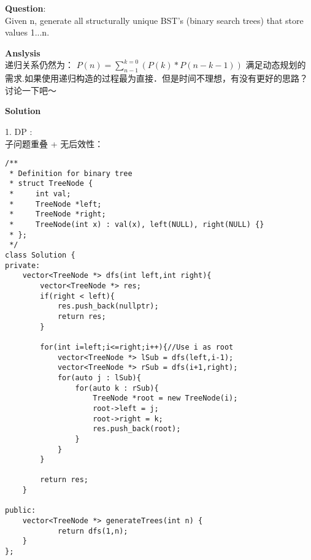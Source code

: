 \begin{description}
    \item{\textbf{Question}}:\\%
		Given n, generate all structurally unique BST's (binary search trees) that store values 1...n.\\

    \item{\textbf{Anslysis}}\\
		递归关系仍然为：
		$P(n)=\sum_{n-1}^{k=0}(P(k)\ast P(n-k-1))$
		满足动态规划的需求.如果使用递归构造的过程最为直接．但是时间不理想，有没有更好的思路？讨论一下吧～
		

    \item{\textbf{Solution}}\\
	\item{1. DP} : \\
		子问题重叠 + 无后效性：\\

    \begin{lstlisting}
/**
 * Definition for binary tree
 * struct TreeNode {
 *     int val;
 *     TreeNode *left;
 *     TreeNode *right;
 *     TreeNode(int x) : val(x), left(NULL), right(NULL) {}
 * };
 */
class Solution {
private:
    vector<TreeNode *> dfs(int left,int right){
        vector<TreeNode *> res;
        if(right < left){
            res.push_back(nullptr);
            return res;
        }   
    
        for(int i=left;i<=right;i++){//Use i as root
            vector<TreeNode *> lSub = dfs(left,i-1);
            vector<TreeNode *> rSub = dfs(i+1,right);
            for(auto j : lSub){
                for(auto k : rSub){
                    TreeNode *root = new TreeNode(i);
                    root->left = j;
                    root->right = k;
                    res.push_back(root);
                }   
            }   
        }   
    
        return res;
    }

public:
    vector<TreeNode *> generateTrees(int n) {
            return dfs(1,n);
    }
};
    \end{lstlisting}
\end{description}


